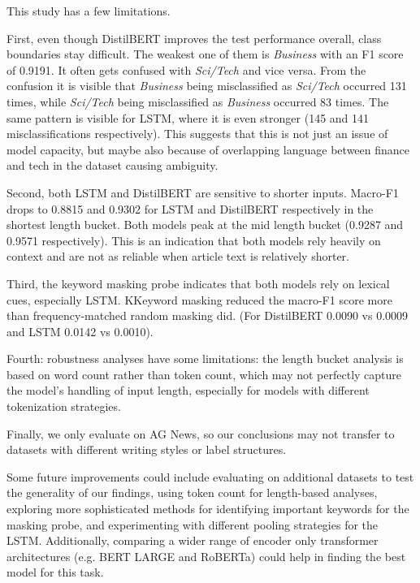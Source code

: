 This study has a few limitations.

First, even though DistilBERT improves the test performance overall, class boundaries stay difficult.
The weakest one of them is \textit{Business} with an F1 score of 0.9191. It often gets confused with \textit{Sci/Tech} and vice versa. From the confusion it is visible that \textit{Business} being misclassified as \textit{Sci/Tech} occurred 131 times, while \textit{Sci/Tech} being misclassified as \textit{Business} occurred 83 times. The same pattern is visible for LSTM, where it is even stronger (145 and 141 misclassifications respectively). This suggests that this is not just an issue of model capacity, but maybe also because of overlapping language between finance and tech in the dataset causing ambiguity.

Second, both LSTM and DistilBERT are sensitive to shorter inputs. Macro-F1 drops to 0.8815 and 0.9302 for LSTM and DistilBERT respectively in the shortest length bucket. Both models peak at the mid length bucket (0.9287 and 0.9571 respectively). This is an indication that both models rely heavily on context and are not as reliable when article text is relatively shorter.

Third, the keyword masking probe indicates that both models rely on lexical cues, especially LSTM. KKeyword masking reduced the macro-F1 score more than frequency-matched random masking did. (For DistilBERT 0.0090 vs 0.0009 and LSTM 0.0142 vs 0.0010).

Fourth: robustness analyses have some limitations: the length bucket analysis is based on word count rather than token count, which may not perfectly capture the model's handling of input length, especially for models with different tokenization strategies.

Finally, we only evaluate on AG News, so our conclusions may not transfer to datasets with different writing styles or label structures.

Some future improvements could include evaluating on additional datasets to test the generality of our findings, using token count for length-based analyses, exploring more sophisticated methods for identifying important keywords for the masking probe, and experimenting with different pooling strategies for the LSTM. Additionally, comparing a wider range of encoder only transformer architectures (e.g. BERT LARGE and RoBERTa) could help in finding the best model for this task.